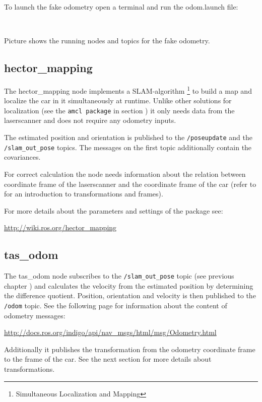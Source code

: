 To launch the fake odometry open a terminal and run the odom.launch file:

 \\

Picture  shows the running nodes and topics for the fake odometry.

\subsection{hector\_mapping}
\label{sec:tas_package_odom_hector}
The hector\_mapping node implements a SLAM-algorithm \footnote{Simultaneous Localization and Mapping} to build a map and localize the car in it simultaneously at runtime. Unlike other solutions for localization (see the \texttt{amcl package}  in section ) it only needs data from the laserscanner and does not require any odometry inputs. 

The estimated position and orientation is published to the \texttt{/poseupdate} and the \texttt{/slam\_out\_pose} topics. The messages on the first topic additionally contain the covariances.
 
For correct calculation the node needs information about the relation between coordinate frame of the laserscanner and the coordinate frame of the car (refer to  for an introduction to transformations and frames). 

For more details about the parameters and settings of the package see:

\hyperref[http://wiki.ros.org/hector_mapping]{http://wiki.ros.org/hector\_mapping}

\subsection{tas\_odom}
\label{sec:tas_package_odom_node}
The tas\_odom node subscribes to the \texttt{/slam\_out\_pose} topic (see previous chapter ) and calculates the velocity from the estimated position by determining the difference quotient. Position, orientation and velocity is then published to the \texttt{/odom} topic. See the following page for information about the content of odometry messages:

\hyperref[http://docs.ros.org/indigo/api/nav_msgs/html/msg/Odometry.html]{http://docs.ros.org/indigo/api/nav\_msgs/html/msg/Odometry.html}

Additionally it publishes the transformation from the odometry coordinate frame to the frame of the car. See the next section for more details about transformations.

